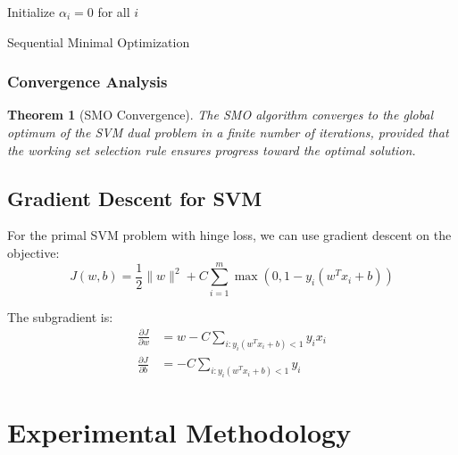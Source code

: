 \documentclass[12pt, a4paper]{article}
\newtheorem{theorem}{Theorem}
\begin{document}
\begin{algorithm}[H]
\SetAlgoLined
{}
Initialize $\alpha_i = 0$ for all $i$\;
\caption{Sequential Minimal Optimization}
\end{algorithm}

\subsubsection{Convergence Analysis}

\begin{theorem}[SMO Convergence]
The SMO algorithm converges to the global optimum of the SVM dual problem in a finite number of iterations, provided that the working set selection rule ensures progress toward the optimal solution.
\end{theorem}

\subsection{Gradient Descent for SVM}

For the primal SVM problem with hinge loss, we can use gradient descent on the objective:
\begin{equation}
J(w, b) = \frac{1}{2}\|w\|^2 + C\sum_{i=1}^m \max(0, 1 - y_i(w^T x_i + b))
\end{equation}

The subgradient is:
\begin{align}
\frac{\partial J}{\partial w} &= w - C\sum_{i: y_i(w^T x_i + b) < 1} y_i x_i \\
\frac{\partial J}{\partial b} &= -C\sum_{i: y_i(w^T x_i + b) < 1} y_i
\end{align}

\section{Experimental Methodology}
\end{document}
